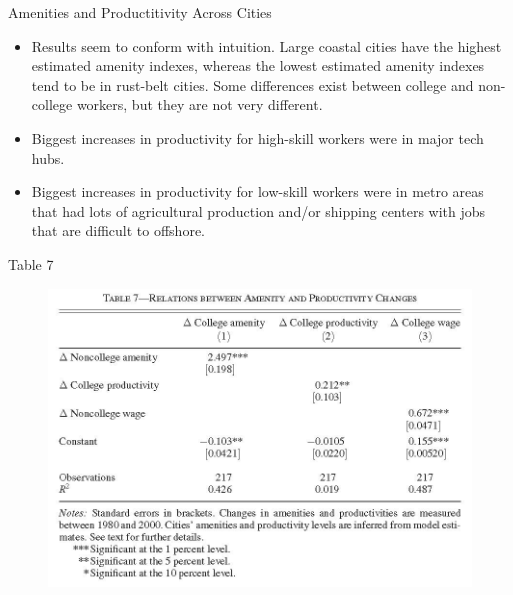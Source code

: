 \documentclass[aspectratio=169]{beamer}
\begin{document}

\begin{frame}{Amenities and Productitivity Across Cities}

\begin{itemize}
    \item<1-> Results seem to conform with intuition.  Large coastal cities have the highest estimated amenity indexes, whereas the lowest estimated amenity indexes tend to be in rust-belt cities.  Some differences exist between college and non-college workers, but they are not very different.
    \item<2-> Biggest increases in productivity for high-skill workers were in major tech hubs.
    \item<3-> Biggest increases in productivity for low-skill workers were in metro areas that had lots of agricultural production and/or shipping centers with jobs that are difficult to offshore.
\end{itemize}
    
\end{frame}


\begin{frame}{Table 7}

\begin{figure}
    \centering
    \includegraphics[scale=0.85]{DiamondTable7.jpg}
    \label{fig:Table7}
\end{figure}
    
\end{frame}
\end{document}
